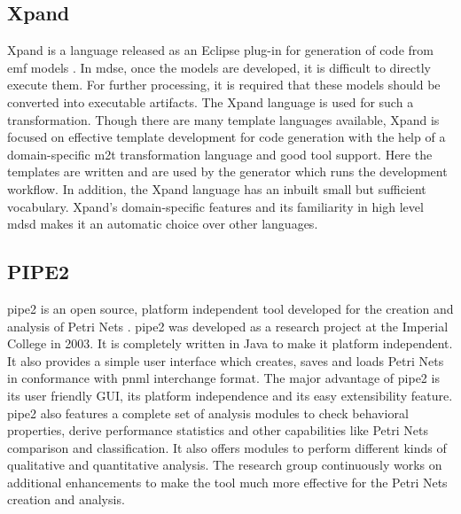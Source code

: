 \subsection{Xpand}
Xpand is a language released as an Eclipse plug-in for generation of code from \gls{emf} models \cite{xpand}. In \gls{mdse}, once the models are developed, it is difficult to directly execute them. For further processing, it is required that these models should be converted into executable artifacts. The Xpand language is used for such a transformation. Though there are many template languages available, Xpand is focused on effective template development for code generation with the help of a domain-specific \gls{m2t} transformation language and good tool support. Here the templates are written and are used by the generator which runs the development workflow. In addition, the Xpand language has an inbuilt small but sufficient vocabulary. Xpand’s domain-specific features and its familiarity in high level \gls{mdsd} makes it an automatic choice over other languages. 

\subsection{PIPE2}
\gls{pipe2} is an open source, platform independent tool developed for the creation and analysis of Petri Nets \cite{bonet2007pipe}. \gls{pipe2} was developed as a research project at the Imperial College in 2003.  It is completely written in Java to make it platform independent. It also provides a simple user interface which creates, saves and loads Petri Nets in conformance with \gls{pnml} interchange format. The major advantage of \gls{pipe2} is its user friendly GUI, its platform independence and its easy extensibility feature. \gls{pipe2} also features a complete set of analysis modules to check behavioral properties, derive performance statistics and other capabilities like Petri Nets comparison and classification. It also offers modules to perform different kinds of qualitative and quantitative analysis. The research group continuously works on additional enhancements to make the tool much more effective for the Petri Nets creation and analysis.
